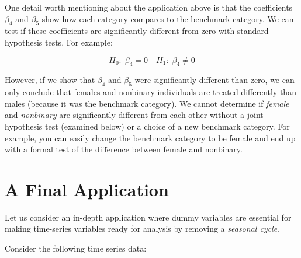 \documentclass[
]{book}
\begin{document}
One detail worth mentioning about the application above is that the coefficients \(\beta_4\) and \(\beta_5\) show how each category compares to the benchmark category. We can test if these coefficients are significantly different from zero with standard hypothesis tests. For example:

\[H_0: \; \beta_4 = 0 \quad H_1: \; \beta_4 \neq 0\]

However, if we show that \(\beta_4\) and \(\beta_5\) were significantly different than zero, we can only conclude that females and nonbinary individuals are treated differently than males (because it was the benchmark category). We cannot determine if \emph{female} and \emph{nonbinary} are significantly different from each other without a joint hypothesis test (examined below) or a choice of a new benchmark category. For example, you can easily change the benchmark category to be female and end up with a formal test of the difference between female and nonbinary.

\hypertarget{a-final-application}{%
\section{A Final Application}\label{a-final-application}}

Let us consider an in-depth application where dummy variables are essential for making time-series variables ready for analysis by removing a \emph{seasonal cycle}.

Consider the following time series data:
\end{document}
